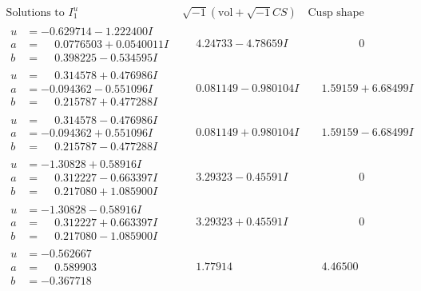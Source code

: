 \documentclass[1p]{elsarticle_modified}
\theoremstyle{definition}
\newcommand{\I}{\sqrt{-1}}
\begin{document}
$$\begin{array}{c|c|c}
\text{Solutions to }I^u_{1}& \I (\text{vol} + \sqrt{-1}CS) & \text{Cusp shape}\\
 \hline 
\begin{aligned}
u &= -0.629714 - 1.222400 I \\
a &= \phantom{-}0.0776503 + 0.0540011 I \\
b &= \phantom{-}0.398225 - 0.534595 I\end{aligned}
 & \phantom{-}4.24733 - 4.78659 I & \phantom{-0.000000 } 0 \\ \hline\begin{aligned}
u &= \phantom{-}0.314578 + 0.476986 I \\
a &= -0.094362 - 0.551096 I \\
b &= \phantom{-}0.215787 + 0.477288 I\end{aligned}
 & \phantom{-}0.081149 - 0.980104 I & \phantom{-}1.59159 + 6.68499 I \\ \hline\begin{aligned}
u &= \phantom{-}0.314578 - 0.476986 I \\
a &= -0.094362 + 0.551096 I \\
b &= \phantom{-}0.215787 - 0.477288 I\end{aligned}
 & \phantom{-}0.081149 + 0.980104 I & \phantom{-}1.59159 - 6.68499 I \\ \hline\begin{aligned}
u &= -1.30828 + 0.58916 I \\
a &= \phantom{-}0.312227 - 0.663397 I \\
b &= \phantom{-}0.217080 + 1.085900 I\end{aligned}
 & \phantom{-}3.29323 - 0.45591 I & \phantom{-0.000000 } 0 \\ \hline\begin{aligned}
u &= -1.30828 - 0.58916 I \\
a &= \phantom{-}0.312227 + 0.663397 I \\
b &= \phantom{-}0.217080 - 1.085900 I\end{aligned}
 & \phantom{-}3.29323 + 0.45591 I & \phantom{-0.000000 } 0 \\ \hline\begin{aligned}
u &= -0.562667\phantom{ +0.000000I} \\
a &= \phantom{-}0.589903\phantom{ +0.000000I} \\
b &= -0.367718\phantom{ +0.000000I}\end{aligned}
 & \phantom{-}1.77914\phantom{ +0.000000I} & \phantom{-}4.46500\phantom{ +0.000000I} \\ \hline\begin{aligned}

\end{aligned}
\end{array}$$
\end{document}
